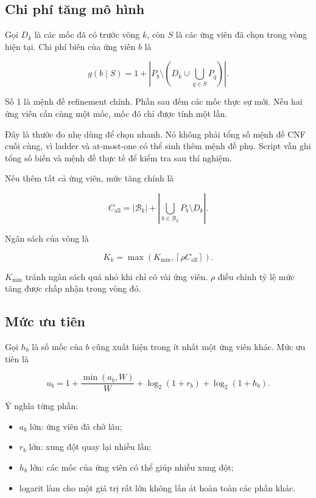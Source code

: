 \documentclass[11pt,a4paper]{article}
\begin{document}
\subsection{Chi phí tăng mô hình}

Gọi $D_k$ là các mốc đã có trước vòng $k$, còn $S$ là các ứng viên đã chọn trong
vòng hiện tại. Chi phí biên của ứng viên $b$ là

\begin{equation}
g(b\mid S)=1+\left|P_b\setminus
\left(D_k\cup\bigcup_{q\in S}P_q\right)\right|.
\end{equation}

Số 1 là mệnh đề refinement chính. Phần sau đếm các mốc thực sự mới. Nếu hai ứng
viên cần cùng một mốc, mốc đó chỉ được tính một lần.

Đây là thước đo nhẹ dùng để chọn nhanh. Nó không phải tổng số mệnh đề CNF cuối
cùng, vì ladder và at-most-one có thể sinh thêm mệnh đề phụ. Script vẫn ghi tổng
số biến và mệnh đề thực tế để kiểm tra sau thí nghiệm.

Nếu thêm tất cả ứng viên, mức tăng chính là

\begin{equation}
C_{\mathrm{all}}=|\mathcal B_k|+
\left|\bigcup_{b\in\mathcal B_k}P_b\setminus D_k\right|.
\end{equation}

Ngân sách của vòng là

\begin{equation}
K_k=\max\!\left(K_{\min},\left\lceil\rho C_{\mathrm{all}}\right\rceil\right).
\end{equation}

$K_{\min}$ tránh ngân sách quá nhỏ khi chỉ có vài ứng viên. $\rho$ điều chỉnh tỷ
lệ mức tăng được chấp nhận trong vòng đó.

\subsection{Mức ưu tiên}

Gọi $h_b$ là số mốc của $b$ cũng xuất hiện trong ít nhất một ứng viên khác. Mức
ưu tiên là

\begin{equation}
u_b=1+\frac{\min(a_b,W)}{W}
       +\log_2(1+r_b)+\log_2(1+h_b).
\end{equation}

Ý nghĩa từng phần:

\begin{itemize}
\item $a_b$ lớn: ứng viên đã chờ lâu;
\item $r_b$ lớn: xung đột quay lại nhiều lần;
\item $h_b$ lớn: các mốc của ứng viên có thể giúp nhiều xung đột;
\item logarit làm cho một giá trị rất lớn không lấn át hoàn toàn các phần khác.
\end{itemize}
\end{document}
